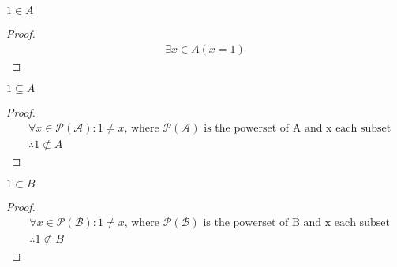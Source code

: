 \begin{question}
  \begin{subquestion}
    $1 \in A$
  \end{subquestion}
  \begin{proof}
    \begin{equation}
      \begin{split}
        \exists x \in A(x = 1)
      \end{split}
    \end{equation}
  \end{proof}

  \begin{subquestion}
    $1 \subseteq A$
  \end{subquestion}
  \begin{proof}
    \begin{equation}
      \begin{split}
        & \forall x \in \mathcal{P(A)}: 1 \neq x \text{, where } \mathcal{P(A)} \text{ is the powerset of A and x each subset} \\
        & \therefore 1 \not \subset A
      \end{split}
    \end{equation}
  \end{proof}

  \begin{subquestion}
    $1 \subset B$
  \end{subquestion}
  \begin{proof}
    \begin{equation}
      \begin{split}
        & \forall x \in \mathcal{P(B)}: 1 \neq x \text{, where } \mathcal{P(B)} \text{ is the powerset of B and x each subset} \\
        & \therefore 1 \not \subset B
      \end{split}
    \end{equation}
  \end{proof}
\end{question}

